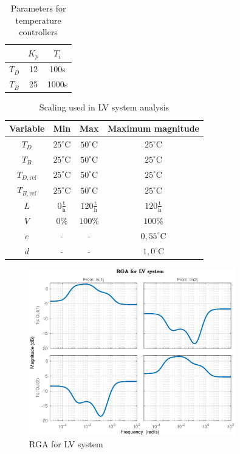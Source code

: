 \documentclass[12pt]{article}
\begin{document}
\begin{table}[h]
\centering
\begin{tabular}{c | c | c }
 & $K_p$ & $T_i$  \\ \hline
 $T_D$ & 12 & 100s \\
 $T_B$ & 25 & 1000s
\end{tabular}
\caption{Parameters for temperature controllers}
\label{tab:LV_parameters}
\end{table}

\begin{table}
\centering
\begin{tabular}{c | c | c | c}
Variable & Min & Max & Maximum magnitude \\ \hline
$T_D$ & $25^\circ$C & $50^\circ$C & $25^\circ$C \\
$T_B$ & $25^\circ$C & $50^\circ$C & $25^\circ$C \\
$T_{D, \textrm{ref}}$ & $25^\circ$C & $50^\circ$C & $25^\circ$C \\
$T_{B, \textrm{ref}}$ & $25^\circ$C & $50^\circ$C & $25^\circ$C \\
$L$ & $0 \frac{\textrm{t}}{\textrm{h}}$ & $120 \frac{\textrm{t}}{\textrm{h}}$ & $120 \frac{\textrm{t}}{\textrm{h}}$ \\
$V$ & $0\%$ & $100\%$ & $100\%$ \\
$e$ & - & - & $0,55^\circ$C \\
$d$ & - & - & $1,0^\circ$C
\end{tabular}
\caption{Scaling used in LV system analysis}
\end{table}

\begin{figure}[p]
\centering
\includegraphics[width=0.8\textwidth]{../Systemanalyse/Log_Data_to_Matlab/Figurer/LV_identifisering/LV_RGA.eps}
\caption{RGA for LV system}
\label{fig:LV_RGA}
\end{figure}
\end{document}
